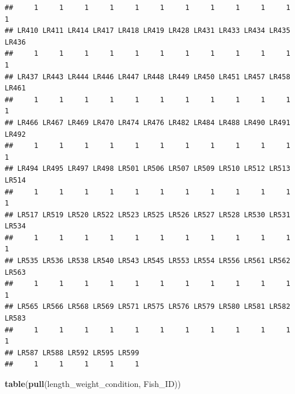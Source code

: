 \documentclass[]{book}
\newenvironment{Shaded}{\begin{snugshade}}{\end{snugshade}}
\newcommand{\KeywordTok}[1]{\textcolor[rgb]{0.13,0.29,0.53}{\textbf{#1}}}
\newcommand{\NormalTok}[1]{#1}
\begin{document}
\begin{verbatim}
##     1     1     1     1     1     1     1     1     1     1     1     1 
## LR410 LR411 LR414 LR417 LR418 LR419 LR428 LR431 LR433 LR434 LR435 LR436 
##     1     1     1     1     1     1     1     1     1     1     1     1 
## LR437 LR443 LR444 LR446 LR447 LR448 LR449 LR450 LR451 LR457 LR458 LR461 
##     1     1     1     1     1     1     1     1     1     1     1     1 
## LR466 LR467 LR469 LR470 LR474 LR476 LR482 LR484 LR488 LR490 LR491 LR492 
##     1     1     1     1     1     1     1     1     1     1     1     1 
## LR494 LR495 LR497 LR498 LR501 LR506 LR507 LR509 LR510 LR512 LR513 LR514 
##     1     1     1     1     1     1     1     1     1     1     1     1 
## LR517 LR519 LR520 LR522 LR523 LR525 LR526 LR527 LR528 LR530 LR531 LR534 
##     1     1     1     1     1     1     1     1     1     1     1     1 
## LR535 LR536 LR538 LR540 LR543 LR545 LR553 LR554 LR556 LR561 LR562 LR563 
##     1     1     1     1     1     1     1     1     1     1     1     1 
## LR565 LR566 LR568 LR569 LR571 LR575 LR576 LR579 LR580 LR581 LR582 LR583 
##     1     1     1     1     1     1     1     1     1     1     1     1 
## LR587 LR588 LR592 LR595 LR599 
##     1     1     1     1     1
\end{verbatim}

\begin{Shaded}
\begin{Highlighting}[]
\KeywordTok{table}\NormalTok{(}\KeywordTok{pull}\NormalTok{(length_weight_condition, Fish_ID))}
\end{Highlighting}
\end{Shaded}
\end{document}
